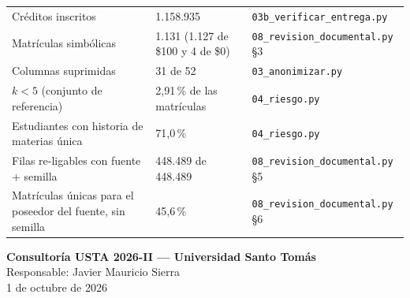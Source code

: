 \documentclass[11pt,a4paper,twoside,twocolumn]{article}
\newcommand{\cod}[1]{\nolinkurl{#1}}
\begin{document}
{\begin{xltabular}{\textwidth}{@{}L P{5.2cm} P{4.6cm}@{}}
Créditos inscritos & 1.158.935 & \cod{03b_verificar_entrega.py} \\
Matrículas simbólicas & 1.131 (1.127 de \$100 y 4 de \$0) & \cod{08_revision_documental.py} §3 \\
Columnas suprimidas & 31 de 52 & \cod{03_anonimizar.py} \\
$k < 5$ (conjunto de referencia) & 2,91\,\% de las matrículas & \cod{04_riesgo.py} \\
Estudiantes con historia de materias única & 71,0\,\% & \cod{04_riesgo.py} \\
Filas re-ligables con fuente + semilla & 448.489 de 448.489 & \cod{08_revision_documental.py} §5 \\
Matrículas únicas para el poseedor del fuente, sin semilla & 45,6\,\% & \cod{08_revision_documental.py} §6 \\
\end{xltabular}
}

\vspace{1cm}
\begin{flushright}
{\color{ustaAzul}\bfseries Consultoría USTA 2026-II --- Universidad Santo Tomás}\\
Responsable: Javier Mauricio Sierra\\
1 de octubre de 2026
\end{flushright}

\end{document}
